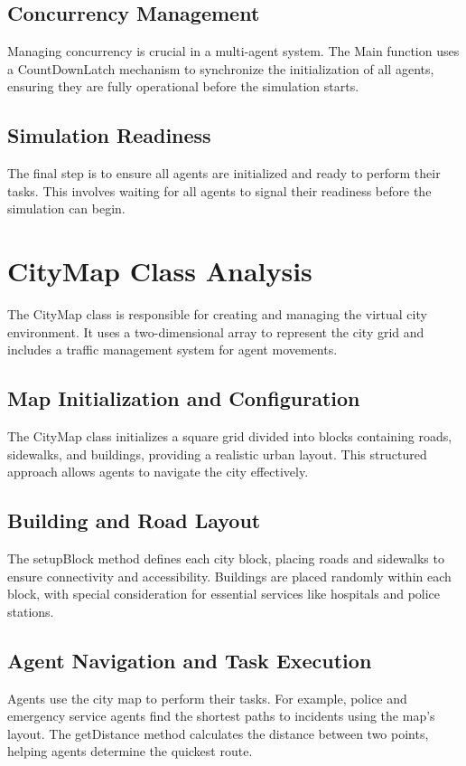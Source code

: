 \documentclass[conference]{IEEEtran}
\begin{document}
  \subsection{Concurrency Management}
  Managing concurrency is crucial in a multi-agent system. The Main function uses a CountDownLatch mechanism to synchronize the initialization of all agents, ensuring they are fully operational before the simulation starts.
  
  \subsection{Simulation Readiness}
  The final step is to ensure all agents are initialized and ready to perform their tasks. This involves waiting for all agents to signal their readiness before the simulation can begin.
  
  
  \section{CityMap Class Analysis}
  The CityMap class is responsible for creating and managing the virtual city environment. It uses a two-dimensional array to represent the city grid and includes a traffic management system for agent movements.
  
  \subsection{Map Initialization and Configuration}
  The CityMap class initializes a square grid divided into blocks containing roads, sidewalks, and buildings, providing a realistic urban layout. This structured approach allows agents to navigate the city effectively.
  
  \subsection{Building and Road Layout}
  The setupBlock method defines each city block, placing roads and sidewalks to ensure connectivity and accessibility. Buildings are placed randomly within each block, with special consideration for essential services like hospitals and police stations.
  
  \subsection{Agent Navigation and Task Execution}
  Agents use the city map to perform their tasks. For example, police and emergency service agents find the shortest paths to incidents using the map's layout. The getDistance method calculates the distance between two points, helping agents determine the quickest route.
  
\end{document}
